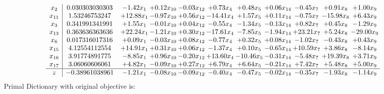 \documentclass[9pt]{article}
\begin{document}
\[\begin{array}{c| c c@{\hskip 2pt} c@{\hskip 2pt} c@{\hskip 2pt} c@{\hskip 2pt} c@{\hskip 2pt} c@{\hskip 2pt} c@{\hskip 2pt} c@{\hskip 2pt} c@{\hskip 2pt} }
 x_{2}   &  0.030303030303 & -1.42 x_{1} & +  0.12 x_{10} & -0.03 x_{12} & +  0.73 x_{4} & +  0.48 x_{5} & +  0.06 x_{14} & -0.45 x_{7} & +  0.91 x_{8} & +  1.00 x_{9}\\
 x_{11}   &  1.53246753247 & + 12.88 x_{1} & -0.97 x_{10} & +  0.56 x_{12} & -14.41 x_{4} & +  1.57 x_{5} & +  0.11 x_{14} & -0.75 x_{7} & -15.98 x_{8} & +  6.43 x_{9}\\
 x_{3}   &  0.341991341991 & +  1.55 x_{1} & -0.01 x_{10} & +  0.04 x_{12} & -0.55 x_{4} & -1.34 x_{5} & -0.13 x_{14} & +  0.82 x_{7} & +  0.45 x_{8} & -1.29 x_{9}\\
 x_{13}   &  0.363636363636 & + 22.24 x_{1} & -1.21 x_{10} & +  0.30 x_{12} & -17.61 x_{4} & -7.85 x_{5} & -1.94 x_{14} & + 23.21 x_{7} & +  5.24 x_{8} & -29.00 x_{9}\\
 x_{6}   &  0.017316017316 & +  0.09 x_{1} & -0.03 x_{10} & +  0.08 x_{12} & -0.77 x_{4} & +  0.32 x_{5} & +  0.08 x_{14} & -1.02 x_{7} & -0.43 x_{8} & +  0.43 x_{9}\\
 x_{15}   &  4.12554112554 & + 14.91 x_{1} & +  0.31 x_{10} & +  0.06 x_{12} & -1.37 x_{4} & +  0.10 x_{5} & -0.65 x_{14} & + 10.59 x_{7} & +  3.86 x_{8} & -8.14 x_{9}\\
 x_{16}   &  3.91774891775 & -8.85 x_{1} & +  0.96 x_{10} & -0.20 x_{12} & + 13.60 x_{4} & -10.46 x_{5} & -0.31 x_{14} & -5.48 x_{7} & + 19.39 x_{8} & +  3.71 x_{9}\\
 x_{17}   &  3.06060606061 & +  4.82 x_{1} & -0.09 x_{10} & +  0.27 x_{12} & +  6.79 x_{4} & +  6.64 x_{5} & -0.21 x_{14} & +  7.42 x_{7} & +  5.48 x_{8} & +  5.00 x_{9}\\
\hline
z    &  -0.38961038961 & -1.21 x_{1} & -0.08 x_{10} & -0.09 x_{12} & -0.40 x_{4} & -0.47 x_{5} & -0.02 x_{14} & -0.35 x_{7} & -1.93 x_{8} & -1.14 x_{9}\\
\end{array}\]
Primal Dictionary with original objective is:
\end{document}
